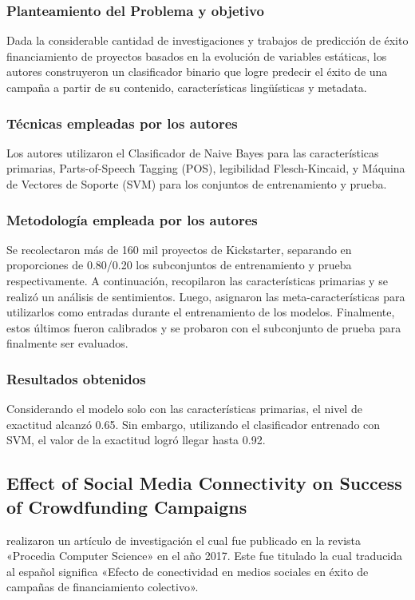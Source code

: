 \subsubsection{Planteamiento del Problema y objetivo}
Dada la considerable cantidad de investigaciones y trabajos de predicción de éxito financiamiento de proyectos basados en la evolución de variables estáticas, los autores construyeron un clasificador binario que logre predecir el éxito de una campaña a partir de su contenido, características lingüísticas y metadata.

\subsubsection{Técnicas empleadas por los autores}
Los autores utilizaron el Clasificador de Naive Bayes para las características primarias, Parts-of-Speech Tagging (POS), legibilidad Flesch-Kincaid, y Máquina de Vectores de Soporte (SVM) para los conjuntos de entrenamiento y prueba.

\subsubsection{Metodología empleada por los autores}
Se recolectaron más de 160 mil proyectos de Kickstarter, separando en proporciones de 0.80/0.20 los subconjuntos de entrenamiento y prueba respectivamente. A continuación, recopilaron las características primarias y se realizó un análisis de sentimientos. Luego, asignaron las meta-características para utilizarlos como entradas durante el entrenamiento de los modelos. Finalmente, estos últimos fueron calibrados y se probaron con el subconjunto de prueba para finalmente ser evaluados.

\subsubsection{Resultados obtenidos}
Considerando el modelo solo con las características primarias, el nivel de exactitud alcanzó 0.65. Sin embargo, utilizando el clasificador entrenado con SVM, el valor de la exactitud logró llegar hasta 0.92.

\subsection{Effect of Social Media Connectivity on Success of Crowdfunding Campaigns \citep*{pr_kaur2017socmedcrowd}}
\citeauthor{pr_kaur2017socmedcrowd} realizaron un artículo de investigación el cual fue publicado en la revista «Procedia Computer Science» en el año 2017. Este fue titulado  la cual traducida al español significa «Efecto de conectividad en medios sociales en éxito de campañas de financiamiento colectivo».

